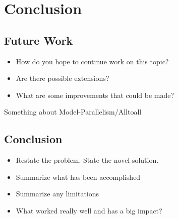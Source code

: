 
\chapter[Conclusion]{Conclusion}\label{ch:Conclusion}

\section{Future Work}
\begin{itemize}
	\item{How do you hope to continue work on this topic?}
	\item{Are there possible extensions?}
	\item{What are some improvements that could be made?}
\end{itemize}
Something about Model-Parallelism/Alltoall

\section{Conclusion}
\begin{itemize}
	\item{Restate the problem. State the novel solution.}
	\item{Summarize what has been accomplished}
	\item{Summarize any limitations}
	\item{What worked really well and has a big impact?}
\end{itemize}

